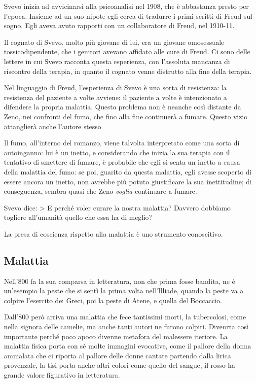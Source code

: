 Svevo inizia ad avvicinarsi alla psicoanalisi nel 1908, che è abbastanza presto per l'epoca. Insieme ad un suo nipote egli cerca di tradurre i primi scritti di Freud sul sogno.
Egli aveva avuto rapporti con un collaboratore di Freud, nel 1910-11.

Il cognato di Svevo, molto più giovane di lui, era un giovane omosessuale tossicodipendente, che i genitori avevano affidato alle cure di Freud. Ci sono delle lettere in cui Svevo racconta questa esperienza, con l'assoluta mancanza di riscontro della terapia, in quanto il cognato venne distrutto alla fine della terapia.

Nel linguaggio di Freud, l'esperienza di Svevo è una sorta di resistenza: la resistenza del paziente a volte avviene: il paziente a volte è intenzionato a difendere la propria malattia.
Questo problema non è neanche così distante da Zeno, nei confronti del fumo, che fino alla fine continuerà a fumare.
Questo vizio attanglierà anche l'autore stesso

Il fumo, all'interno del romanzo, viene talvolta interpretato come una sorta di autoinganno: lui è un inetto, e considerando che inizia la sua terapia con il tentativo di smettere di fumare, è probabile che egli si senta un inetto a causa della malattia del fumo: se poi, guarito da questa malattia, egli avesse scoperto di essere ancora un inetto, non avrebbe più potuto giustificare la sua inettitudine; di conseguenza, sembra quasi che Zeno \textit{voglia} continuare a fumare.

Svevo dice:
> E perché voler curare la nostra malattia? Davvero dobbiamo togliere all'umanità quello che essa ha di meglio?

La presa di coscienza rispetto alla malattia è uno strumento conoscitivo.

\subsection{Malattia}

Nell’800 fa la sua comparsa in letteratura, non che prima fosse bandita, ne è un’esempio la peste che si sentì la prima volta nell’Illiade, quando la peste va a colpire l’esercito dei Greci, poi la peste di Atene, e quella del Boccaccio.

Dall’800 però arriva una malattia che fece tantissimi morti, la tubercolosi, come nella signora delle camelie, ma anche tanti autori ne furono colpiti. 
Divenrta così importante perché poco  apoco divenne metafora del malessere iteriore. La malattia fisica porta con sé molte immagini evocative, come il pallore della donna ammalata che ci riporta al pallore delle donne cantate partendo dalla lirica provenzale, la tisi porta anche altri colori come quello del sangue, il rosso ha grande valore figurativo in letteratura.

